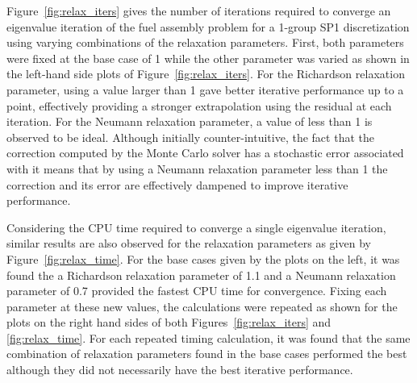 Figure~\ref{fig:relax_iters} gives the number of iterations required
to converge an eigenvalue iteration of the fuel assembly problem for a
1-group SP1 discretization using varying combinations of the
relaxation parameters. First, both parameters were fixed at the base
case of 1 while the other parameter was varied as shown in the
left-hand side plots of Figure~\ref{fig:relax_iters}. For the
Richardson relaxation parameter, using a value larger than 1 gave
better iterative performance up to a point, effectively providing a
stronger extrapolation using the residual at each iteration. For the
Neumann relaxation parameter, a value of less than 1 is observed to be
ideal. Although initially counter-intuitive, the fact that the
correction computed by the Monte Carlo solver has a stochastic error
associated with it means that by using a Neumann relaxation parameter
less than 1 the correction and its error are effectively dampened to
improve iterative performance.

Considering the CPU time required to converge a single eigenvalue
iteration, similar results are also observed for the relaxation
parameters as given by Figure~\ref{fig:relax_time}. For the base cases
given by the plots on the left, it was found the a Richardson
relaxation parameter of 1.1 and a Neumann relaxation parameter of 0.7
provided the fastest CPU time for convergence. Fixing each parameter
at these new values, the calculations were repeated as shown for the
plots on the right hand sides of both Figures~\ref{fig:relax_iters}
and \ref{fig:relax_time}. For each repeated timing calculation, it was
found that the same combination of relaxation parameters found in the
base cases performed the best although they did not necessarily have
the best iterative performance.

